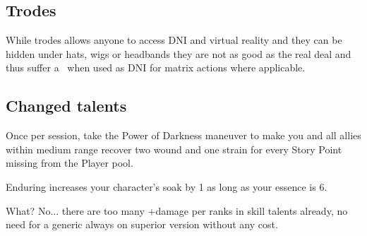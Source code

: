 \documentclass{book}
\begin{document}
\begin{multicols}{2}
\subsection{Trodes}
While trodes allows anyone to access DNI and virtual reality and they can be hidden under hats, wigs or headbands they are not as good as the real deal and thus suffer a \SetbackDie\ when used as DNI for matrix actions where applicable.

\subsection{Changed talents}
 Once per session, take the Power of Darkness maneuver to make you and all allies within medium range recover two wound and one strain for every Story Point missing from the Player pool. %

 Enduring increases your character's soak by 1 as long as your essence is 6.

 What? No... there are too many +damage per ranks in skill talents already, no need for a generic always on superior version without any cost.


\end{multicols}
	
\end{document}
